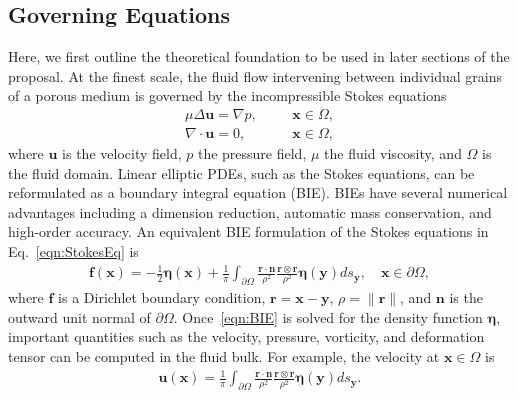 \documentclass[11pt]{article}
\newcommand{\bvec}[1]{{\mathbf{#1}}}
\newcommand{\grad}{\nabla}
\newcommand{\uu}{\bvec{u}}
\newcommand{\xx}{\bvec{x}}
\newcommand{\nn}{{\mathbf{n}}}
\newcommand{\bd}{\partial}
\newcommand{\eeta}{\boldsymbol{\eta}}
\newcommand{\rr}{\mathbf{r}}
\newcommand{\ff}{\mathbf{f}}
\newcommand{\yy}{\mathbf{y}}
\begin{document}
\subsection{Governing Equations}

Here, we first outline the theoretical foundation to be used in later sections of the proposal. At the finest scale, the fluid flow intervening between individual grains of a porous medium is governed by the incompressible Stokes equations \begin{equation}
\label{eqn:StokesEq}
\begin{split}
\mu \Delta \uu = \grad p,	&\hspace{20pt} \xx \in \Omega, \\
\grad \cdot \uu = 0, 		&\hspace{20pt} \xx \in \Omega,
\end{split}
\end{equation}
where $\uu$ is the velocity field, $p$ the pressure field, $\mu$ the
fluid viscosity, and $\Omega$ is the fluid domain. Linear elliptic PDEs,
such as the Stokes equations, can be reformulated as a boundary integral
equation (BIE).  BIEs have several numerical advantages including a
dimension reduction, automatic mass conservation, and high-order
accuracy. An equivalent BIE formulation of the Stokes equations in
Eq.~\eqref{eqn:StokesEq} is
\begin{align}
  \label{eqn:BIE}
  \ff(\xx) = -\frac{1}{2}\eeta(\xx) + \frac{1}{\pi} \int_{\bd\Omega}
    \frac{\rr \cdot \nn}{\rho^2} \frac{\rr \otimes \rr}{\rho^2}
    \eeta(\yy) ds_\yy, \quad \xx \in \bd\Omega,
\end{align}
where $\ff$ is a Dirichlet boundary condition, $\rr = \xx - \yy$, $\rho = \|\rr\|$, and $\nn$ is the outward unit normal of $\bd\Omega$.  Once~\eqref{eqn:BIE} is solved for the density function $\eeta$, important quantities such as the velocity, pressure, vorticity, and deformation tensor can be computed in the fluid bulk.  For example, the velocity at $\xx \in \Omega$ is 
\begin{align}
  \uu(\xx) = \frac{1}{\pi} \int_{\bd\Omega}
    \frac{\rr \cdot \nn}{\rho^2} \frac{\rr \otimes \rr}{\rho^2}
    \eeta(\yy) ds_\yy.
\end{align}
\end{document}
